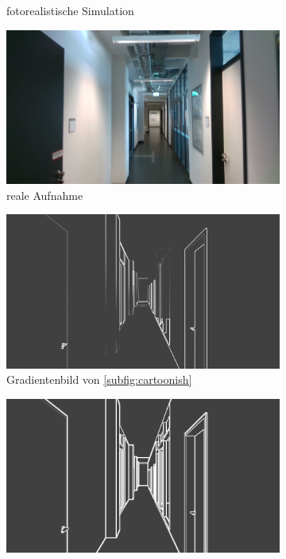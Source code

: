 \begin{figure}[htp]
\begin{subfigure}[t]{0.24\linewidth}
		\caption{fotorealistische \hspace{1cm} Simulation}
		\label{subfig:photorealistic}
	\end{subfigure}
	\hfill 
	\begin{subfigure}[t]{0.24\linewidth}
		\centering
		\includegraphics[width=\linewidth]{images/syn_dataset/r000305.png}
		\caption{reale Aufnahme}
		\label{subfig:real}
	\end{subfigure}
	\hfill 
	\begin{subfigure}[t]{0.24\linewidth}
		\centering
		\includegraphics[width=\linewidth]{images/syn_dataset/bg00708.png}
		\caption{Gradientenbild  \hspace{1cm} von \ref{subfig:cartoonish}}
	\end{subfigure}
	\hfill
	\begin{subfigure}[t]{0.24\linewidth}
		\centering
		\includegraphics[width=\linewidth]{images/syn_dataset/eg00708.png}

\end{subfigure}
\end{figure}
